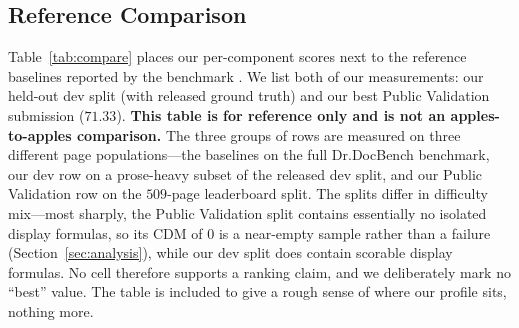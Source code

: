 \documentclass[11pt]{article}
\begin{document}
\subsection{Reference Comparison}
Table~\ref{tab:compare} places our per-component scores next to the reference
baselines reported by the benchmark \citep{yang2026dr}. We list both of our
measurements: our held-out dev split (with released ground truth) and our best
Public Validation submission ($71.33$). \textbf{This table is for reference only and
is not an apples-to-apples comparison.} The three groups of rows are measured on
three different page populations---the baselines on the full Dr.DocBench benchmark,
our dev row on a prose-heavy subset of the released dev split, and our Public
Validation row on the $509$-page leaderboard split. The splits differ in difficulty
mix---most sharply, the Public Validation split contains essentially no isolated
display formulas, so its CDM of $0$ is a near-empty sample rather than a failure
(Section~\ref{sec:analysis}), while our dev split does contain scorable display
formulas. No cell therefore supports a ranking claim, and we deliberately mark no
``best'' value. The table is
included to give a rough sense of where our profile sits, nothing more.
\end{document}
